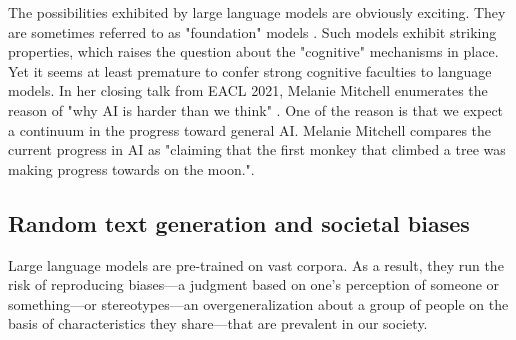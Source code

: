The possibilities exhibited by large language models are obviously exciting. 
They are sometimes referred to as "foundation" models \parencite{bommasani_21}. Such models exhibit striking properties, which raises the question about the "cognitive" mechanisms in place. 
Yet it seems at least premature to confer strong cognitive faculties to language models. In her closing talk from EACL 2021, Melanie Mitchell enumerates the reason of "why AI is harder than we think" \parencite{mitchell_21}. One of the reason is that we expect a continuum in the progress toward general AI. Melanie Mitchell compares the current progress in AI as "claiming that the first monkey that climbed a tree was making progress towards on the moon.".


\subsection{Random text generation and societal biases} 

Large language models are pre-trained on vast corpora. As a result, they run the risk of reproducing biases—a judgment based on one's perception of someone or something—or stereotypes—an overgeneralization about a group of people on the basis of characteristics they share—that are prevalent in our society. 

